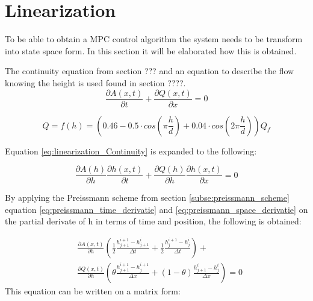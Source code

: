 \section{Linearization}\label{se:linearization}
To be able to obtain a MPC control algorithm the system needs to be transform into state space form. In this section it will be elaborated how this is obtained.


The continuity equation from section ??? and an equation to describe the flow knowing the height is used found in section ????. 
\begin{equation}\label{eq:linearization_Continuity}
\frac{\partial A(x,t)}{\partial t} + \frac{\partial Q(x,t)}{\partial x}=0
\end{equation}

\begin{equation}
	Q = f(h) = \left(0.46-0.5 \cdot cos\left(\pi \frac{h}{d}\right)+0.04\cdot cos\left(2\pi\frac{h}{d}\right)\right)Q_f
\end{equation}

Equation \ref{eq:linearization_Continuity} is expanded to the following:

\begin{equation}
	\frac{\partial A(h)}{\partial h}\frac{\partial h(x,t)}{\partial t} + \frac{\partial Q(h)}{\partial h}\frac{\partial h(x,t)}{\partial x}=0
\end{equation}

By applying the Preissmann scheme from section \ref{subse:preissmann_scheme} equation \ref{eq:preissmann_time_derivatie} and \ref{eq:preissmann_space_derivatie} on the partial derivate of h in terms of time and position, the following is obtained: 

\begin{equation}
\begin{aligned}
	&\frac{\partial A(x,t)}{\partial h} \left(\frac{1}{2}\frac{h_{j+1}^{i+1}-h_{j+1}^i}{\Delta t} +  \frac{1}{2} \frac{h_{j}^{i+1} - h_j^i}{\Delta t}\right) + \\ &\frac{\partial Q(x,t)}{\partial h}\left(\theta \frac{h_{j+1}^{i+1}-h_j^{i+1}}{\Delta x}+(1-\theta)\frac{h_{j+1}^i - h_j^i}{\Delta x}\right)=0
\end{aligned}
\end{equation}
This equation can be written on a matrix form:


